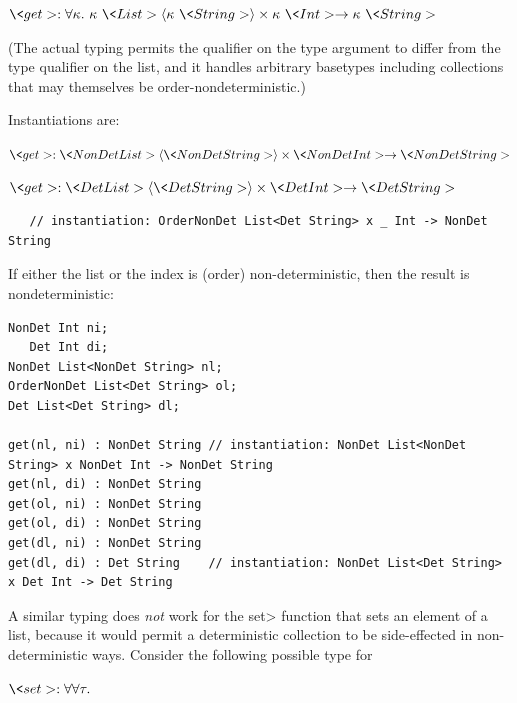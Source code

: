 $\<get> : \forallt{\kappa} \kappa\ \<List>\angles{\kappa\ \<String>} \times \kappa\ \<Int> \rightarrow \kappa\ \<String>$

(The actual typing permits the qualifier on the type argument to differ
from the type qualifier on the list, and it handles arbitrary basetypes
including collections that may themselves be order-nondeterministic.)

Instantiations are:

$\<get> : \<NonDet List>\angles{\<NonDet String>} \times \<NonDet Int> \rightarrow \<NonDet String>$

$\<get> : \<Det List>\angles{\<Det String>} \times \<Det Int> \rightarrow \<Det String>$

\begin{Verbatim}
   // instantiation: OrderNonDet List<Det String> x _ Int -> NonDet String 
\end{Verbatim}

If either the list or the index is (order) non-deterministic, then the result is
nondeterministic:

\begin{Verbatim}
NonDet Int ni;
   Det Int di;
NonDet List<NonDet String> nl;
OrderNonDet List<Det String> ol;
Det List<Det String> dl;

get(nl, ni) : NonDet String // instantiation: NonDet List<NonDet String> x NonDet Int -> NonDet String
get(nl, di) : NonDet String
get(ol, ni) : NonDet String
get(ol, di) : NonDet String
get(dl, ni) : NonDet String
get(dl, di) : Det String    // instantiation: NonDet List<Det String> x Det Int -> Det String
\end{Verbatim}


A similar typing does \emph{not} work for the \<set> function that sets an
element of a list, because it would permit a deterministic collection to
be side-effected in non-deterministic ways.  Consider the following
possible type for

$\<set> : \forall \forallt{\tau}$

